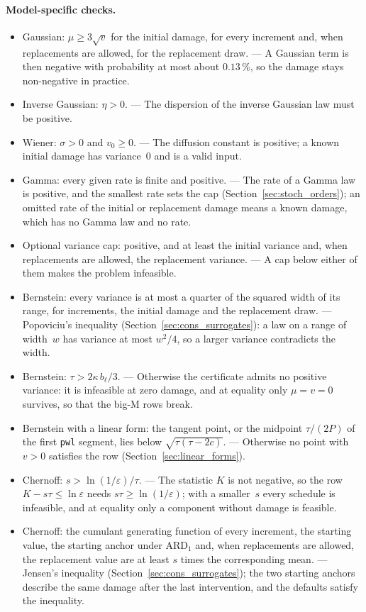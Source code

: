 \documentclass[11pt,a4paper]{article}
\theoremstyle{plain}
\theoremstyle{definition}
\theoremstyle{remark}
\begin{document}
\paragraph{Model-specific checks.}
\begin{itemize}[nosep]
  \item Gaussian: $\mu \ge 3\sqrt{v}$ for the initial damage, for every increment and, when replacements are allowed, for the replacement draw. --- A Gaussian term is then negative with probability at most about $0.13\,\%$, so the damage stays non-negative in practice.
  \item Inverse Gaussian: $\eta > 0$. --- The dispersion of the inverse Gaussian law must be positive.
  \item Wiener: $\sigma > 0$ and $v_0 \ge 0$. --- The diffusion constant is positive; a known initial damage has variance~$0$ and is a valid input.
  \item Gamma: every given rate is finite and positive. --- The rate of a Gamma law is positive, and the smallest rate sets the cap (Section~\ref{sec:stoch_orders}); an omitted rate of the initial or replacement damage means a known damage, which has no Gamma law and no rate.
  \item Optional variance cap: positive, and at least the initial variance and, when replacements are allowed, the replacement variance. --- A cap below either of them makes the problem infeasible.
  \item Bernstein: every variance is at most a quarter of the squared width of its range, for increments, the initial damage and the replacement draw. --- Popoviciu's inequality (Section~\ref{sec:cons_surrogates}): a law on a range of width~$w$ has variance at most $w^2/4$, so a larger variance contradicts the width.
  \item Bernstein: $\tau > 2\kappa\, b_\ell/3$. --- Otherwise the certificate admits no positive variance: it is infeasible at zero damage, and at equality only $\mu = v = 0$ survives, so that the big-M rows break.
  \item Bernstein with a linear form: the tangent point, or the midpoint $\tau/(2P)$ of the first \texttt{pwl} segment, lies below $\sqrt{\tau(\tau - 2c)}$. --- Otherwise no point with $v > 0$ satisfies the row (Section~\ref{sec:linear_forms}).
  \item Chernoff: $s > \ln(1/\varepsilon)/\tau$. --- The statistic $K$ is not negative, so the row $K - s\tau \le \ln\varepsilon$ needs $s\tau \ge \ln(1/\varepsilon)$; with a smaller~$s$ every schedule is infeasible, and at equality only a component without damage is feasible.
  \item Chernoff: the cumulant generating function of every increment, the starting value, the starting anchor under $\text{ARD}_1$ and, when replacements are allowed, the replacement value are at least $s$ times the corresponding mean. --- Jensen's inequality (Section~\ref{sec:cons_surrogates}); the two starting anchors describe the same damage after the last intervention, and the defaults satisfy the inequality.
\end{itemize}
\end{document}
